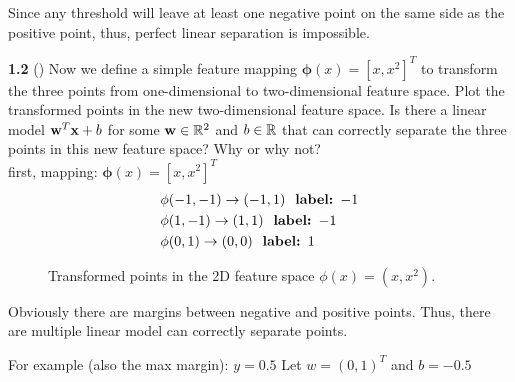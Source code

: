 Since any threshold will leave at least one negative point on the same side as the positive point, thus, perfect linear separation is impossible.

\bigskip

\textbf{1.2} () Now we define a simple feature mapping $\mathbf{\phi}(x) = [x, x^2]^T$ to transform the three points from one-dimensional to two-dimensional feature space. Plot the transformed points in the new two-dimensional feature space. Is there a linear model $\mathbf{w}^T\mathbf{x} +b$ for some $\mathbf{w}\in \mathbb{R}^2$ and $b \in \mathbb{R}$ that can correctly separate the three points in this new feature space? Why or why not?\\

first, mapping: $\mathbf{\phi}(x) = [x, x^2]^T$
\begin{align*}
&\mathbf{\phi}(-1, -1) \rightarrow  (-1,1) \textbf{\; label: $-1$}\\
&\mathbf{\phi}(1, -1) \rightarrow (1,1) \textbf{\; label: $-1$}\\
&\mathbf{\phi}(0, 1) \rightarrow (0,0) \textbf{\; label: $1$}
\end{align*}

\begin{figure}[htbp]
\centering
{}
\caption{Transformed points in the 2D feature space $\phi(x) = (x,x^2)$.}
\end{figure}

Obviously there are margins between negative and positive points. Thus, there are multiple linear model can correctly separate points.

For example (also the max margin): $y= 0.5$
Let $w=(0,1)^T$ and $b= -0.5$


